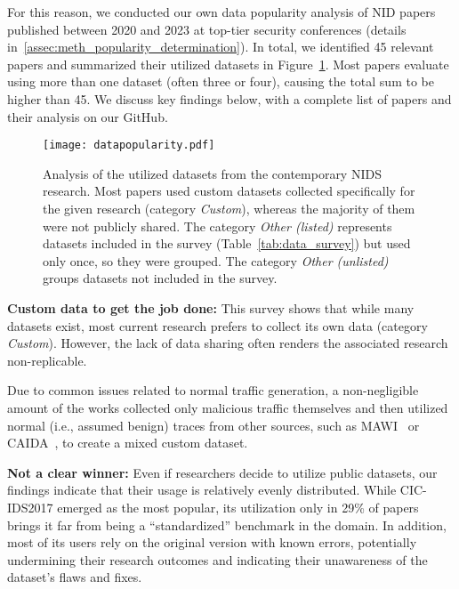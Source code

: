For this reason, we conducted our own data popularity analysis of NID papers published between 2020 and 2023 at top-tier security conferences (details in~\ref{assec:meth_popularity_determination}). In total, we identified 45 relevant papers and summarized their utilized datasets in Figure~\ref{fig:data_popularity_graph}. Most papers evaluate using more than one dataset (often three or four), causing the total sum to be higher than 45. We discuss key findings below, with a complete list of papers and their analysis on our GitHub.

\begin{figure}[t]
    \centering
    \texttt{[image: datapopularity.pdf]}
    \vspace*{-2em}
    \caption{Analysis of the utilized datasets from the contemporary NIDS research. Most papers used custom datasets collected specifically for the given research (category \emph{Custom}), whereas the majority of them were not publicly shared. The category \emph{Other (listed)} represents datasets included in the survey (Table~\ref{tab:data_survey}) but used only once, so they were grouped. The category \emph{Other (unlisted)} groups datasets not included in the survey.}
    \label{fig:data_popularity_graph}
\end{figure}

\textbf{Custom data to get the job done:} This survey shows that while many datasets exist, most current research prefers to collect its own data (category \emph{Custom}). However, the lack of data sharing often renders the associated research non-replicable.

Due to common issues related to normal traffic generation, a non-negligible amount of the works collected only malicious traffic themselves and then utilized normal (i.e., assumed benign) traces from other sources, such as  MAWI~\cite{mawi2024_mawi_wg_traffic_archive} or CAIDA~\cite{caida_anonymized_traces}, to create a mixed custom dataset.

\textbf{Not a clear winner:} Even if researchers decide to utilize public datasets, our findings indicate that their usage is relatively evenly distributed. While CIC-IDS2017 emerged as the most popular, its utilization only in 29\% of papers brings it far from being a ``standardized'' benchmark in the domain. In addition, most of its users rely on the original version with known errors, potentially undermining their research outcomes and indicating their unawareness of the dataset's flaws and fixes.

